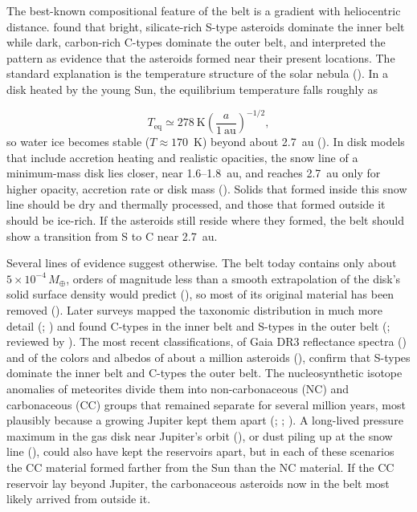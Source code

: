 \documentclass[twocolumn]{aastex701}
\begin{document}
The best-known compositional feature of the belt is a gradient with heliocentric distance. \citet{gradie1982} found that bright, silicate-rich S-type asteroids dominate the inner belt while dark, carbon-rich C-types dominate the outer belt, and interpreted the pattern as evidence that the asteroids formed near their present locations. The standard explanation is the temperature structure of the solar nebula (\citealt{hayashi1981}). In a disk heated by the young Sun, the equilibrium temperature falls roughly as

\begin{equation}\label{eq:1}
T_{\mathrm{eq}} \simeq 278\ \mathrm{K}\left(\frac{a}{1\ \mathrm{au}}\right)^{-1/2},
\end{equation}
so water ice becomes stable ($T \approx 170$~K) beyond about 2.7~au (\citealt{hayashi1981}). In disk models that include accretion heating and realistic opacities, the snow line of a minimum-mass disk lies closer, near 1.6–1.8~au, and reaches 2.7~au only for higher opacity, accretion rate or disk mass (\citealt{lecar2006}). Solids that formed inside this snow line should be dry and thermally processed, and those that formed outside it should be ice-rich. If the asteroids still reside where they formed, the belt should show a transition from S to C near 2.7~au.

Several lines of evidence suggest otherwise. The belt today contains only about $5 \times 10^{-4}\,M_{\oplus}$, orders of magnitude less than a smooth extrapolation of the disk’s solid surface density would predict (\citealt{weidenschilling1977}), so most of its original material has been removed (\citealt{morbidelli2015}). Later surveys mapped the taxonomic distribution in much more detail (\citealt{mothediniz2003}; \citealt{demeo2013}) and found C-types in the inner belt and S-types in the outer belt (\citealt{demeo2014}; reviewed by \citealt{demeo2015}). The most recent classifications, of Gaia DR3 reflectance spectra (\citealt{tinautruano2026}) and of the colors and albedos of about a million asteroids (\citealt{vavra2026}), confirm that S-types dominate the inner belt and \mbox{C-types} the outer belt. The nucleosynthetic isotope anomalies of meteorites divide them into non-carbonaceous (NC) and carbonaceous (CC) groups that remained separate for several million years, most plausibly because a growing Jupiter kept them apart (\citealt{warren2011}; \citealt{kruijer2017}; \citealt{kleine2020}). A long-lived pressure maximum in the gas disk near Jupiter’s orbit (\citealt{brasser2020}), or dust piling up at the snow line (\citealt{lichtenberg2021}), could also have kept the reservoirs apart, but in each of these scenarios the CC material formed farther from the Sun than the NC material. If the CC reservoir lay beyond Jupiter, the carbonaceous asteroids now in the belt most likely arrived from outside it.
\end{document}
